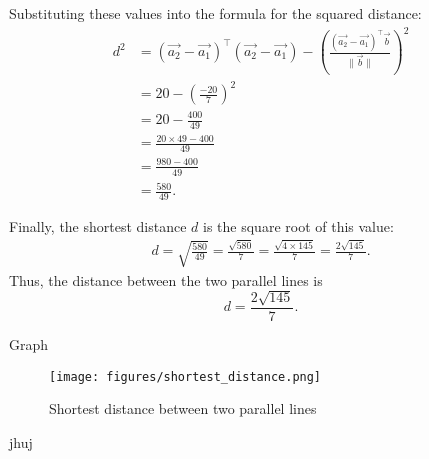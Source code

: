 \documentclass{beamer}
\begin{document}
\begin{frame}
Substituting these values into the formula for the squared distance:
\begin{align}
    d^2 
    &= (\vec{a_2} - \vec{a_1})^\top (\vec{a_2} - \vec{a_1})
    - \left( \frac{ (\vec{a_2} - \vec{a_1})^\top \vec{b} }{ \lVert \vec{b} \rVert } \right)^2 \\[6pt]
    &= 20 - \left( \frac{-20}{7} \right)^2 \\[6pt]
    &= 20 - \frac{400}{49} \\[6pt]
    &= \frac{20 \times 49 - 400}{49} \\[6pt]
    &= \frac{980 - 400}{49} \\[6pt]
    &= \frac{580}{49}.
\end{align}
\end{frame}
\begin{frame}
Finally, the shortest distance $d$ is the square root of this value:
\begin{align}
    d = \sqrt{\frac{580}{49}} = \frac{\sqrt{580}}{7} = \frac{\sqrt{4 \times 145}}{7} = \frac{2\sqrt{145}}{7}.
\end{align}
Thus, the distance between the two parallel lines is
\[
\boxed{d = \frac{2\sqrt{145}}{7}}.
\]
\end{frame}
\begin{frame}{Graph}
\begin{figure}[h]
    \centering
    \texttt{[image: figures/shortest\_distance.png]}
    \caption{Shortest distance between two parallel lines}
    \label{fig:placeholder}
\end{figure}

jhuj

\end{frame}
\end{document}
